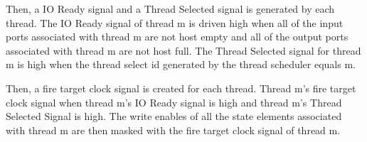Then, a IO Ready signal and a Thread Selected signal is generated by each thread. The IO Ready signal of thread m is driven high when all of the input ports associated with thread m are not host empty and all of the output ports associated with thread m are not host full. The Thread Selected signal for thread m is high when the thread select id generated by the thread scheduler equals m.

Then, a fire target clock signal is created for each thread. Thread m's fire target clock signal when thread m's IO Ready signal is high and thread m's Thread Selected Signal is high. The write enables of all the state elements associated with thread m are then masked with the fire target clock signal of thread m.


